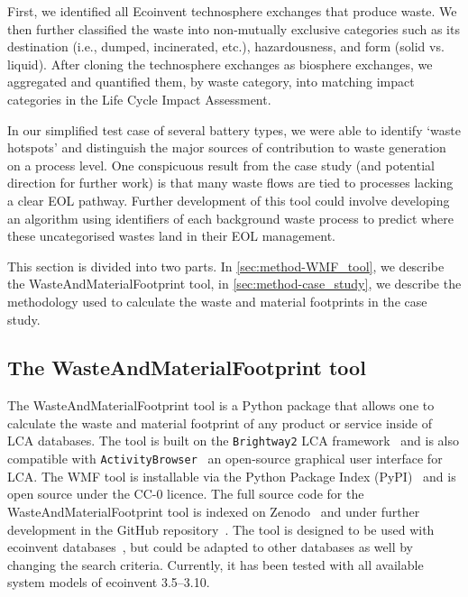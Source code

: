 

First, we identified all Ecoinvent technosphere exchanges that produce waste. We then further classified the waste into non-mutually exclusive categories such as its destination (i.e., dumped, incinerated, etc.), hazardousness, and form (solid vs. liquid). After cloning the technosphere exchanges as biosphere exchanges, we aggregated and quantified them, by waste category, into matching impact categories in the Life Cycle Impact Assessment.

In our simplified test case of several battery types, we were able to identify `waste hotspots' and distinguish the major sources of contribution to waste generation on a process level. One conspicuous result from the case study (and potential direction for further work) is that many waste flows are tied to processes lacking a clear EOL pathway. Further development of this tool could involve developing an algorithm using identifiers of each background waste process to predict where these uncategorised wastes land in their EOL management.

This section is divided into two parts. In \autoref{sec:method-WMF_tool}, we describe the WasteAndMaterialFootprint tool, in \autoref{sec:method-case_study}, we describe the methodology used to calculate the waste and material footprints in the case study.

\subsection{The WasteAndMaterialFootprint tool}
\label{sec:method-WMF_tool}

The WasteAndMaterialFootprint tool is a Python package that allows one to calculate the waste and material footprint of any product or service inside of LCA databases. The tool is built on the \texttt{Brightway2} LCA framework~\citep{mutel2017brightway} and is also compatible with \texttt{ActivityBrowser}~\citep{steubing2020activitybrowser} an open-source graphical user interface for LCA. The WMF tool is installable via the Python Package Index (PyPI)~\citep{mcdowall2023wmfpipy} and is open source under the CC-0 licence. The full source code for the WasteAndMaterialFootprint tool is indexed on Zenodo~\citep{mcdowall2023wmfzenodo} and under further development in the GitHub repository~\citep{mcdowall2024wmfgithub}. The tool is designed to be used with ecoinvent databases~\citep{ecoinvent2016version3}, but could be adapted to other databases as well by changing the search criteria. Currently, it has been tested with all available system models of ecoinvent 3.5--3.10.

